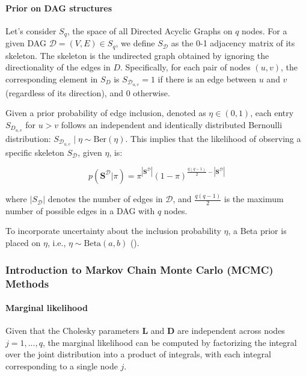 \documentclass{report}
\begin{document}
\paragraph{Prior on DAG structures}
Let's consider $S_q$, the space of all Directed Acyclic Graphs on $q$ nodes. For a given DAG $\mathcal{D} = (V, E) \in S_q$, we define $S_{\mathcal{D}}$ as the 0-1 adjacency matrix of its skeleton. The skeleton is the undirected graph obtained by ignoring the directionality of the edges in $D$. Specifically, for each pair of nodes $(u, v)$, the corresponding element in $S_D$ is $S_{\mathcal{D}_{u,v}} = 1$ if there is an edge between $u$ and $v$ (regardless of its direction), and $0$ otherwise.

Given a prior probability of edge inclusion, denoted as $\eta \in (0, 1)$, each entry $S_{D_{u,v}}$ for $u > v$ follows an independent and identically distributed Bernoulli distribution: $S_{\mathcal{D}_{u,v}} \mid \eta \sim \text{Ber}(\eta)$. This implies that the likelihood of observing a specific skeleton $S_\mathcal{D}$, given $\eta$, is:

\begin{equation}
	p(\mathbf{S}^\mathcal{D}|\pi)=\pi^{|\mathbf{S}^\mathcal{D}|}(1-\pi)^{\frac{q(q-1)}{2}-|\mathbf{S}^\mathcal{D}|}
\end{equation}

where $|S_{\mathcal{D}}|$ denotes the number of edges in $\mathcal{D}$, and $\frac{q(q-1)}{2}$ is the maximum number of possible edges in a DAG with $q$ nodes.

To incorporate uncertainty about the inclusion probability $\eta$, a Beta prior is placed on $\eta$, i.e., $\eta \sim \text{Beta}(a, b)$ (\citet{castelletti2023bayesian}). 

\subsubsection{Introduction to Markov Chain Monte Carlo (MCMC) Methods}

\paragraph{Marginal likelihood} Given that the Cholesky parameters $\mathbf{L}$ and $\mathbf{D}$ are independent across nodes $j=1,...,q$, the marginal likelihood can be computed by factorizing the integral over the joint distribution into a product of integrals, with each integral corresponding to a single node $j$.
\end{document}
